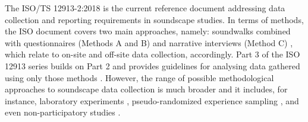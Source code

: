The ISO/TS 12913-2:2018 is the current reference document addressing data collection and reporting requirements in soundscape studies. In terms of methods, the ISO document covers two main approaches, namely: soundwalks combined with questionnaires (Methods A and B) and narrative interviews (Method C) \citep{ISO12913Part2}, which relate to on-site and off-site data collection, accordingly. Part 3 of the ISO 12913 series builds on Part 2 and provides guidelines for analysing data gathered using only those methods \citep{ISO12913Part3}. However, the range of possible methodological approaches to soundscape data collection is much broader and it includes, for instance, laboratory experiments \citep{Aletta2016Soundscape,Sun2019Classification,Oberman2018Towards}, pseudo-randomized experience sampling \citep{Craig2017Experience}, and even non-participatory studies \citep{Lavia2018Non}. 




